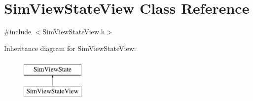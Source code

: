 \hypertarget{class_sim_view_state_view}{\section{Sim\+View\+State\+View Class Reference}
\label{class_sim_view_state_view}
}


{\ttfamily \#include $<$Sim\+View\+State\+View.\+h$>$}

Inheritance diagram for Sim\+View\+State\+View\+:\begin{figure}[H]
\begin{center}
\leavevmode
\includegraphics[height=2.000000cm]{class_sim_view_state_view}
\end{center}
\end{figure}
